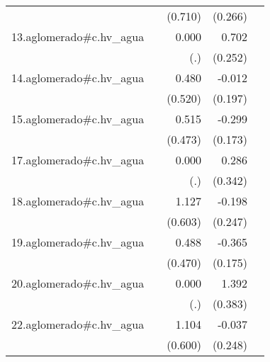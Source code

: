 {\begin{longtable}{l*{4}{D{.}{.}{-1}}}
            &                     &     (0.710)         &     (0.266)         &                     \\
\addlinespace
13.aglomerado#c.hv\_agua&                     &       0.000         &       0.702\sym{**} &                     \\
            &                     &         (.)         &     (0.252)         &                     \\
\addlinespace
14.aglomerado#c.hv\_agua&                     &       0.480         &      -0.012         &                     \\
            &                     &     (0.520)         &     (0.197)         &                     \\
\addlinespace
15.aglomerado#c.hv\_agua&                     &       0.515         &      -0.299         &                     \\
            &                     &     (0.473)         &     (0.173)         &                     \\
\addlinespace
17.aglomerado#c.hv\_agua&                     &       0.000         &       0.286         &                     \\
            &                     &         (.)         &     (0.342)         &                     \\
\addlinespace
18.aglomerado#c.hv\_agua&                     &       1.127         &      -0.198         &                     \\
            &                     &     (0.603)         &     (0.247)         &                     \\
\addlinespace
19.aglomerado#c.hv\_agua&                     &       0.488         &      -0.365\sym{*}  &                     \\
            &                     &     (0.470)         &     (0.175)         &                     \\
\addlinespace
20.aglomerado#c.hv\_agua&                     &       0.000         &       1.392\sym{***}&                     \\
            &                     &         (.)         &     (0.383)         &                     \\
\addlinespace
22.aglomerado#c.hv\_agua&                     &       1.104         &      -0.037         &                     \\
            &                     &     (0.600)         &     (0.248)         &                     \\

\end{longtable}}
